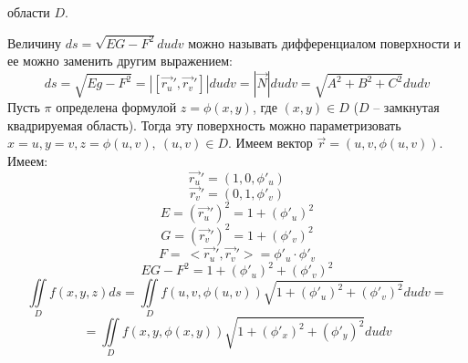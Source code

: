 \documentclass[../../main.tex]{subfiles}
\begin{document}
    области
     $D$.\\
    \begin{rem}
    Величину $ds = \sqrt{EG - F^2} du dv$ можно называть
     дифференциалом поверхности и ее можно заменить другим выражением:
    \[ds = \sqrt{Eg - F^2} = |[\overrightarrow{r_u}', \overrightarrow{r_v}']| 
    du dv =
     |\overrightarrow{N}| du dv = \sqrt{A^2 + B^2 + C^2} du dv \] 	
    Пусть $\pi$ определена формулой $z= \phi(x,y)$, где $(x,y) \in D$ ($D$ \---
     замкнутая квадрируемая область). Тогда эту поверхность можно 
     параметризовать
      $x=u, y = v, z= \phi(u,v), \ (u, v) \in D$. Имеем вектор 
      $\overrightarrow{r} =
       (u, v, \phi(u,v))$. Имеем:
    \[\overrightarrow{r_u}' = (1, 0, \phi'_u) \] 
    \[\overrightarrow{r_v}' = (0, 1, \phi'_v)\]
	\[E =(\overrightarrow{r_u}')^2 = 1 + (\phi'_u)^2\]
	\[G =(\overrightarrow{r_v}')^2 = 1 + (\phi'_v)^2\]
	\[F = \ <\overrightarrow{r_u}', \overrightarrow{r_v}'> = \phi'_u \cdot 
	\phi'_v\]
	\[EG - F^2 = 1 + (\phi'_u)^2 + (\phi'_v)^2 \]
	\[\iint \limits_D f(x, y, z)ds = \iint \limits_D f(u,v, \phi(u,v)) \sqrt{1 +
		 (\phi'_u)^2 + (\phi'_v)^2} dudv = \] \[= \iint \limits_D f(x,y, \phi(x,y))
	  \sqrt{1 + (\phi'_x)^2 + (\phi'_y)^2} dudv \]
	\end{rem}
\end{document}
